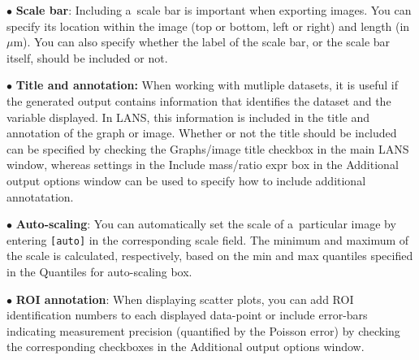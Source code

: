 \documentclass[a4paper, 11pt]{article}
\newcommand{\ttt}[1]{\texttt{#1}}
\newcommand{\lans}[1]{{\color{magenta}#1}}
\newcommand{\lanscb}[1]{{\color{darkgreen}#1}}
\newcommand{\lanstf}[1]{{\color{cyan}#1}}
\newcommand\bul{\vskip5pt\noindent$\bullet${ }}
\newcommand\bb[1]{\textbf{#1}}
\begin{document}
\bul \lanscb{\bb{Scale bar}}: Including a~scale bar is important when exporting images. You can specify its location within the image (top or bottom, left or right) and length (in $\mu$m). You can also specify whether the label of the scale bar, or the scale bar itself, should be included or not.

\bul \bb{Title and annotation:} When working with mutliple datasets, it is useful if the generated output contains information that identifies the dataset and the variable displayed. In LANS, this information is included in the title and annotation of the graph or image. Whether or not the title should be included can be specified by checking the \lanscb{Graphs/image title} checkbox in the main LANS window, whereas settings in the \lanscb{Include mass/ratio expr} box in the \lans{Additional output options} window can be used to specify how to include additional annotatation.

\bul \bb{Auto-scaling}: You can automatically set the scale of a~particular image by entering \ttt{[auto]} in the corresponding \lanstf{scale} field. The minimum and maximum of the scale is calculated, respectively, based on the \lanstf{min} and \lanstf{max} quantiles specified in the \lanscb{Quantiles for auto-scaling} box. 

\bul \bb{ROI annotation}: When displaying scatter plots, you can \lanscb{add ROI identification numbers} to each displayed data-point or \lanscb{include error-bars} indicating measurement precision (quantified by the Poisson error) by checking the corresponding checkboxes in the \lans{Additional output options} window.

\end{document}
